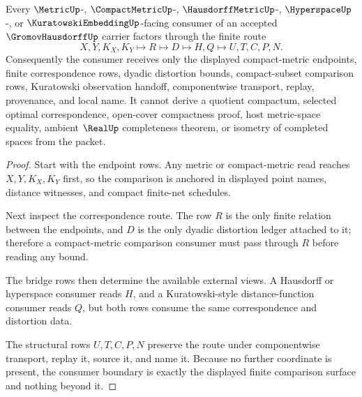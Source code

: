 \begin{theorem}
\label{thm:gromov-hausdorff-correspondence-bridge}
Every $\MetricUp$-, $\CompactMetricUp$-, $\HausdorffMetricUp$-, $\HyperspaceUp$-, or $\KuratowskiEmbeddingUp$-facing consumer of an accepted $\GromovHausdorffUp$ carrier factors through the finite route
$$
X,Y,K_X,K_Y \longmapsto R \longmapsto D \longmapsto H,Q \longmapsto U,T,C,P,N .
$$
Consequently the consumer receives only the displayed compact-metric endpoints, finite correspondence rows, dyadic distortion bounds, compact-subset comparison rows, Kuratowski observation handoff, componentwise transport, replay, provenance, and local name. It cannot derive a quotient compactum, selected optimal correspondence, open-cover compactness proof, host metric-space equality, ambient $\RealUp$ completeness theorem, or isometry of completed spaces from the packet.
\end{theorem}
\begin{proof}
Start with the endpoint rows. Any metric or compact-metric read reaches $X,Y,K_X,K_Y$ first, so the comparison is anchored in displayed point names, distance witnesses, and compact finite-net schedules.

Next inspect the correspondence route. The row $R$ is the only finite relation between the endpoints, and $D$ is the only dyadic distortion ledger attached to it; therefore a compact-metric comparison consumer must pass through $R$ before reading any bound.

The bridge rows then determine the available external views. A Hausdorff or hyperspace consumer reads $H$, and a Kuratowski-style distance-function consumer reads $Q$, but both rows consume the same correspondence and distortion data.

The structural rows $U,T,C,P,N$ preserve the route under componentwise transport, replay it, source it, and name it. Because no further coordinate is present, the consumer boundary is exactly the displayed finite comparison surface and nothing beyond it.
\end{proof}

